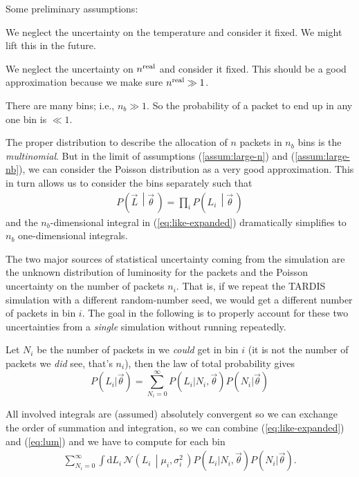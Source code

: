 \documentclass[a4,12pt]{article}
\newcommand{\given}[2]{\left(#1\, \middle| #2 \, \right)}
\newcommand{\gaussian}{\ensuremath{\mathcal{N}}}
\newcommand{\Lumi}{\ensuremath{L_i}}
\newcommand{\real}{\ensuremath{{\rm real}}}
\newcommand{\rmdx}[1]{\mbox{d} #1 \,} %
\newcommand{\vecL}{\ensuremath{\vec{L}}}
\newcommand{\vecth}{\ensuremath{{\vec{\theta}}}}
\def \refeq#1{(\ref{eq:#1})}
\newcommand{\tardis}{TARDIS}
\begin{document}
Some preliminary assumptions:
\begin{compactenum}[(a)]
  \item We neglect the uncertainty on the temperature and consider it
    fixed. We might lift this in the future.
  \item \label{assum:large-n} We neglect the uncertainty on $n^\real$ and consider it
    fixed. This should be a good approximation because we make sure
    $n^\real \gg 1$.
  \item \label{assum:large-nb} There are many bins; i.e., $n_b \gg 1$. So the probability of
    a packet to end up in any one bin is $\ll 1$.
\end{compactenum}
The proper distribution to describe the allocation of $n$ packets in
$n_b$ bins is the \emph{multinomial}. But in the limit of assumptions
(\ref{assum:large-n}) and (\ref{assum:large-nb}), we can consider the
Poisson distribution as a very good approximation. This in turn allows
us to consider the bins separately such that
\begin{align}
  \label{eq:factor-L}
  P\given{\vecL}{\vecth} = \prod_i P\given{L_i}{\vecth}
\end{align}
and the $n_b$-dimensional integral in \refeq{like-expanded}
dramatically simplifies to $n_b$ one-dimensional integrals.

The two major sources of statistical uncertainty coming from the
simulation are the unknown distribution of luminosity for the packets
and the Poisson uncertainty on the number of packets $n_i$. That is,
if we repeat the \tardis{} simulation with a different random-number
seed, we would get a different number of packets in bin $i$. The goal
in the following is to properly account for these two uncertainties
from a \emph{single} simulation without running repeatedly.

Let $N_i$ be the number of packets in we \emph{could} get in bin $i$
(it is not the number of packets we \emph{did} see, that's $n_i$),
then the law of total probability gives
\begin{equation}
  \label{eq:lum}
  P(\Lumi | \vecth) = \sum_{N_i=0}^{\infty} P(\Lumi | N_i, \vecth) P(N_i | \vecth)
\end{equation}

All involved integrals are (assumed) absolutely convergent so we can
exchange the order of summation and integration, so we can combine
\refeq{like-expanded} and \refeq{lum} and we have to compute for each bin
\begin{align}
  \label{eq:sum-integral}
  \sum_{N_i=0}^{\infty} \int \rmdx{\Lumi} \gaussian\given{\Lumi}{\mu_i, \sigma_i^2}
  P(\Lumi | N_i, \vecth) P(N_i | \vecth).
\end{align}
\end{document}
